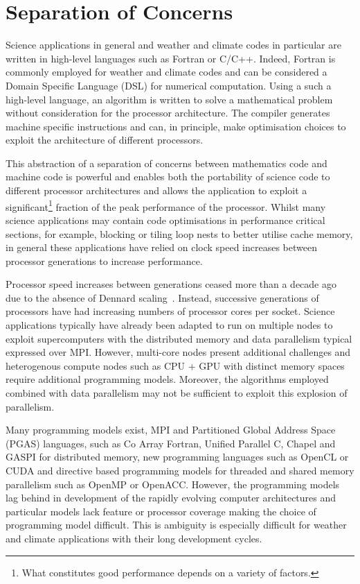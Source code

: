 \documentclass[review,times]{elsarticle}
\begin{document}
\section{\label{sec:SoC}Separation of Concerns}
Science applications in general and weather and climate codes in
particular are written in high-level languages such as Fortran or
C/C++. Indeed, Fortran is commonly employed for weather and climate
codes and can be considered a Domain Specific Language (DSL) for
numerical computation. Using a such a high-level language, an
algorithm is written to solve a mathematical problem without
consideration for the processor architecture. The compiler generates
machine specific instructions and can, in principle, make optimisation
choices to exploit the architecture of different processors.

This abstraction of a separation of concerns between mathematics code
and machine code is powerful and enables both the portability of
science code to different processor architectures and allows the
application to exploit a significant\footnote{What constitutes good
  performance depends on a variety of factors.} fraction of the peak
performance of the processor. Whilst many science applications may
contain code optimisations in performance critical sections, for
example, blocking or tiling loop nests to better utilise cache memory,
in general these applications have relied on clock
speed increases between processor generations to increase performance.

Processor speed increases between generations ceased more than a decade
ago due to the absence of Dennard scaling~\cite{dennard}. Instead,
successive generations of processors have had increasing numbers of processor cores per
socket. Science applications typically have already been adapted to run on multiple
nodes to exploit supercomputers with the distributed memory and data parallelism
typical expressed over MPI. However, multi-core nodes present
additional challenges and heterogenous compute nodes such as
CPU + GPU with distinct memory spaces require additional programming
models. Moreover, the algorithms employed combined with data
parallelism may not be sufficient to exploit this explosion of parallelism.

Many programming models exist, MPI and Partitioned Global Address
Space (PGAS) languages, such as Co Array Fortran, Unified Parallel C,
Chapel and GASPI for distributed memory, new programming languages such
as OpenCL or CUDA and directive based programming models for threaded
and shared memory parallelism such as OpenMP or OpenACC. However,
the programming models lag behind in development of the rapidly evolving computer
architectures and particular models lack feature or processor coverage
making the choice of programming model difficult. This is ambiguity is
especially difficult for weather and climate applications with their long development
cycles. 
\end{document}
